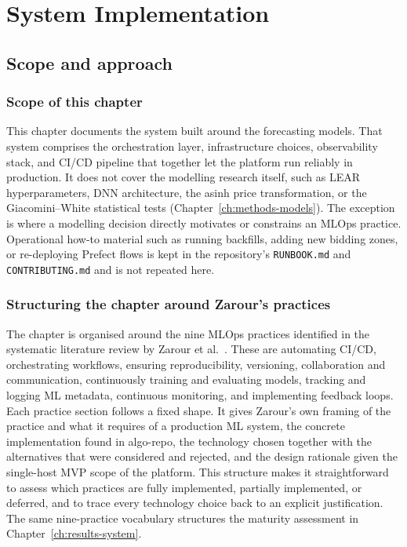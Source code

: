 \chapter{System Implementation}
\label{ch:system-implementation}

\section{Scope and approach}

\subsection{Scope of this chapter}
This chapter documents the system built around the forecasting models.
That system comprises the orchestration layer, infrastructure choices,
observability stack, and CI/CD pipeline that together let the platform run
reliably in production. It
does not cover the modelling research itself, such as LEAR hyperparameters, DNN
architecture, the asinh price transformation, or the Giacomini--White statistical
tests (Chapter~\ref{ch:methods-models}). The
exception is where a modelling decision directly motivates or constrains an
MLOps practice. Operational how-to material such as running backfills, adding
new bidding zones, or re-deploying Prefect flows is kept in the repository's
\texttt{RUNBOOK.md} and \texttt{CONTRIBUTING.md} and is not repeated here.

\subsection{Structuring the chapter around Zarour's practices}
The chapter is organised around the nine MLOps practices identified in the
systematic literature review by Zarour et al.\ \cite{zarour2025}. These are
automating CI/CD, orchestrating workflows, ensuring reproducibility, versioning,
collaboration and communication, continuously training and evaluating models,
tracking and logging ML metadata, continuous monitoring, and implementing
feedback loops. Each practice section follows a fixed shape. It gives Zarour's
own framing of the practice and what it requires of a production ML system, the
concrete implementation found in algo-repo, the technology chosen together with
the alternatives that were considered and rejected, and the design rationale
given the single-host MVP scope of the platform. This
structure makes it straightforward to assess which practices are fully
implemented, partially implemented, or deferred, and to trace
every technology choice back to an explicit justification. The same nine-practice
vocabulary structures the maturity assessment in
Chapter~\ref{ch:results-system}.

